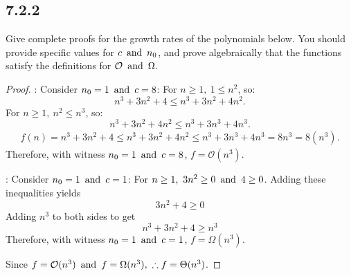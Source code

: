 \subsection*{7.2.2}
Give complete proofs for the growth rates of the polynomials below. You should provide specific values for $c \operatorname{~\text{and}~} n_0$, and prove algebraically that the functions satisfy the definitions for $\mathcal{O} \operatorname{~\text{and}~} \Omega$.
\begin{enumerate}
  \begin{proof}
    :
    Consider $n_0 = 1 \operatorname{~\text{and}~} c = 8$:
    For $n \geq 1,~1 \leq n^2$, so:
    \[
      n^3 + 3n^2 + 4 \leq n^3 + 3n^2 + 4n^2.
    \]
    For $n \geq 1,~n^2 \leq n^3$, so:
    \[
      n^3 + 3n^2 + 4n^2 \leq n^3 + 3n^3 + 4n^3.
    \]
    \begin{align*}
      f(n) = n^3 + 3n^2 + 4 \leq n^3 + 3n^2 + 4n^2 \leq n^3 + 3n^3 + 4n^3 = 8n^3 = 8(n^3).
    \end{align*}
    Therefore, with witness $n_0 = 1 \operatorname{~\text{and}~} c = 8$, $f = \mathcal{O}(n^3)$.

    :
    Consider $n_0 = 1 \operatorname{~\text{and}~} c = 1$:
    For $n \geq 1,~3n^2 \geq 0 \operatorname{~\text{and}~} 4 \geq 0$. Adding these inequalities yields
    \[
      3n^2 + 4 \geq 0
    \]
    Adding $n^3$ to both sides to get
    \[
      n^3 + 3n^2 + 4 \geq n^3
    \]
    Therefore, with witness $n_0 = 1 \operatorname{~\text{and}~} c = 1$, $f = \Omega(n^3)$.

    Since $f = \mathcal{O}(n^3) \operatorname{~\text{and}~} f = \Omega(n^3),~\therefore f = \Theta(n^3)$.
  \end{proof}
\end{enumerate}

